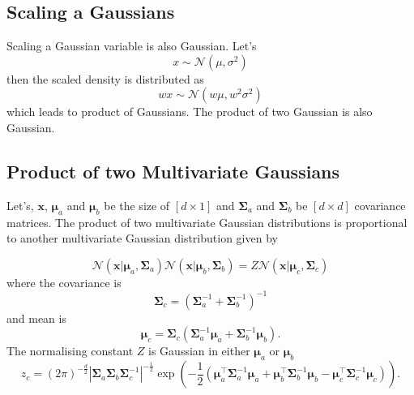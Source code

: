 \subsection{Scaling a Gaussians}
Scaling a Gaussian variable is also Gaussian. Let's
\begin{equation}\label{eq:Gaussian_density_sc}
 x\sim\mathcal{N}\left(\mu,\sigma^{2}\right)
\end{equation}
then the scaled density is distributed as
\begin{equation}\label{eq:Gaussian_density_sc}
 wx\sim\mathcal{N}\left(w\mu,w^2\sigma^{2}\right)
\end{equation}
which leads to product of Gaussians. The product of two Gaussian is also Gaussian.

\subsection{Product of two Multivariate Gaussians}
Let's, $\textbf{x}$, $\boldsymbol{\mu}_a$ and $\boldsymbol{\mu}_b$ be the size of $\left[d\times 1 \right]$ and $\boldsymbol{\Sigma}_a$ and $\boldsymbol{\Sigma}_b$ be  $\left[d\times d \right]$ covariance matrices. The product of two multivariate Gaussian distributions is proportional to another multivariate  Gaussian distribution given by

\begin{equation}\label{eq:app_products}
\mathcal{N}\left(\textbf{x}|\boldsymbol{\mu}_a,\boldsymbol{\Sigma}_a\right) \mathcal{N}\left(\textbf{x}|\boldsymbol{\mu}_b,\boldsymbol{\Sigma}_b\right)=
Z\mathcal{N}\left(\textbf{x}|\boldsymbol{\mu}_c,\boldsymbol{\Sigma}_c\right)
\end{equation}
where the covariance is
\begin{equation}\label{eq:app_products_cov}
\boldsymbol{\Sigma}_c = \left(\boldsymbol{\Sigma}_a^{-1}+\boldsymbol{\Sigma}_b^{-1}\right)^{-1}
\end{equation}
and mean is 
\begin{equation}\label{eq:app_products_mean}
\boldsymbol{\mu}_c = \boldsymbol{\Sigma}_c \left(\boldsymbol{\Sigma}_a^{-1}\boldsymbol{\mu}_a+\boldsymbol{\Sigma}_b^{-1}\boldsymbol{\mu}_b\right).
\end{equation}
The normalising constant $Z$ is Gaussian in either $\boldsymbol{\mu}_a$ or $\boldsymbol{\mu}_b$ 
\begin{equation}\label{eq:app_products_const}
z_c=\left(2\pi\right)^{-\frac{d}{2}}|\boldsymbol{\Sigma}_a\boldsymbol{\Sigma}_b\boldsymbol{\Sigma}_c^{-1}|^{-\frac{1}{2}}\exp\left(-\frac{1}{2}\left(\boldsymbol{\mu}_a^\top\boldsymbol{\Sigma}_a^{-1}\boldsymbol{\mu}_a+\boldsymbol{\mu}_b^\top\boldsymbol{\Sigma}_b^{-1}\boldsymbol{\mu}_b-\boldsymbol{\mu}_c^\top\boldsymbol{\Sigma}_c^{-1}\boldsymbol{\mu}_c\right)\right).
\end{equation}

